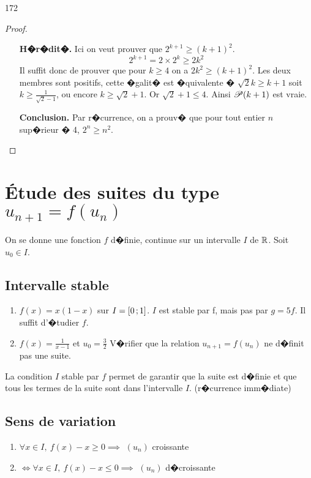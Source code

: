 \begin{dingautolist}{172}
\begin{proof}
\begin{itemize}
\item[\bf H�r�dit�.] Ici on veut prouver que $2^{k+1} \geq  (k+1)^2$.
\[2^{k+1}=2\times 2^{k} \geq 2k^2  \]
Il suffit donc de prouver que pour $k\geq 4$ on a $2k^2\geq
(k+1)^2$. Les deux membres sont positifs, cette �galit� est
�quivalente � $\sqrt{2}k\geq k+1$ soit $k\geq \frac{1}{\sqrt{2}-1}$,
ou encore $k\geq \sqrt{2}+1$. Or $\sqrt{2}+1\leq 4$.
Ainsi $\mathscr{P} (k+1)$ est vraie.
\item[\bf Conclusion.] Par r�currence, on a prouv� que  pour tout
  entier $n$ sup�rieur � 4, $2^n \geq  n^2$.

\end{itemize}
\end{proof}
\end{dingautolist}



\section{\'Etude des suites du type $u_{n+1}=f(u_n)$}
On se donne une fonction $f$ d�finie, continue sur un intervalle $I$ de
$\mathbb{R}$. Soit $u_0\in I$.
\subsection{Intervalle stable}
\exemples
  \begin{enumerate}
  \item $f(x)=x(1-x)$ sur $I=\left[ 0\, ; 1 \right]$. $I$ est stable par f, mais
pas par $g=5f$. Il suffit d'�tudier $f$.
\item $f(x)=\frac{1}{x-1}$ et $u_0=\frac32$ V�rifier que la relation
  $u_{n+1}=f(u_n)$ ne d�finit pas une suite.
  \end{enumerate}

La condition $I$ stable par $f$ permet de garantir que la suite est
d�finie et que tous les termes de la suite sont dans l'intervalle $I$.
(r�currence imm�diate)

\subsection{Sens de variation}
\begin{prop}
  \begin{enumerate}
  \item $ \forall x \in I,\ f(x)-x\geq 0 \implies$ $(u_n)$ croissante
  \item $\iff \forall x \in I,\ f(x)-x\leq 0 \implies$ $(u_n)$ d�croissante
  \end{enumerate}
\end{prop}

